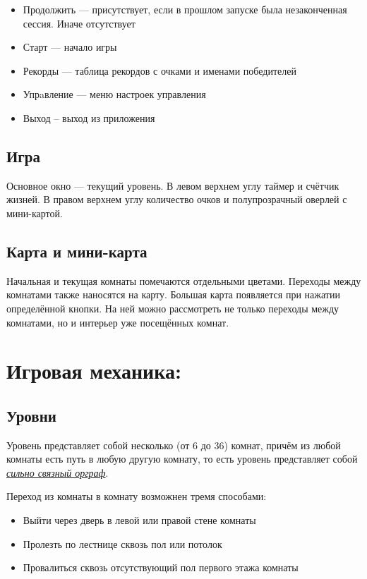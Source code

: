 \documentclass[12pt,a4paper,fullpage]{article}
\begin{document}
\begin{itemize}
\item Продолжить --- присутствует, если в прошлом запуске была незаконченная сессия. Иначе отсутствует
\item Старт --- начало игры
\item Рекорды --- таблица рекордов с очками и именами победителей
\item Упрaвление --- меню настроек управления
\item Выход -- выход из приложения
\end{itemize}
\subsection{Игра}
\noindent {}

Основное окно --- текущий уровень. В левом верхнем углу таймер и счётчик жизней. В правом верхнем углу количество очков и полупрозрачный оверлей с мини-картой.
\subsection{Карта и мини-карта}
Начальная и текущая комнаты помечаются отдельными цветами. Переходы между комнатами также наносятся на карту.
Большая карта появляется при нажатии определённой кнопки. На ней можно рассмотреть не только переходы между комнатами, но и интерьер уже посещённых комнат.\\
\section{Игровая механика:}
\subsection{Уровни}
Уровень представляет собой несколько (от 6 до 36) комнат, причём из любой комнаты есть путь в любую другую комнату, то есть уровень представляет собой \href{http://ru.wikipedia.org/wiki/%
}{\textit{сильно связный орграф}}.

Переход из комнаты в комнату возможнен тремя способами:
\begin{itemize}
\item Выйти через дверь в левой или правой стене комнаты
\item Пролезть по лестнице сквозь пол или потолок
\item Провалиться сквозь отсутствующий пол первого этажа комнаты
\end{itemize}
\end{document}
